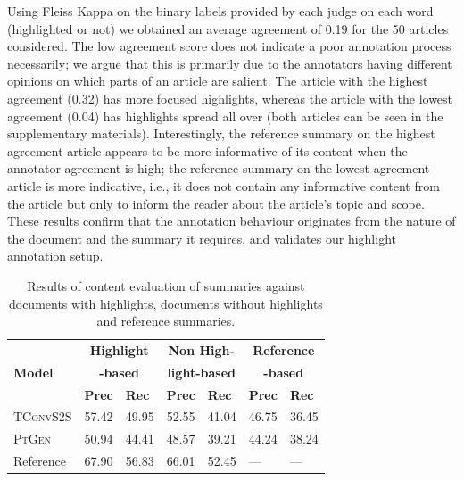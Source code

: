 \documentclass[11pt,a4paper]{article}
\newcommand\ptgen{\textsc{PtGen}}
\newcommand\tconv{\textsc{TConvS2S}}
\begin{document}
Using Fleiss Kappa \citep{Josep1971} on the binary labels provided by each judge on each word (highlighted or not) we obtained an average agreement of 0.19 for the 50 articles considered. The low agreement score does not indicate a poor annotation process necessarily; we argue that this is primarily due to the annotators having different opinions on which parts of an article are salient. The article with the highest agreement (0.32) has more focused highlights, whereas the article with the lowest agreement (0.04) has highlights spread all over (both articles can be seen in the supplementary materials). Interestingly, the reference summary on the highest agreement article appears to be more informative of its content when the annotator agreement is high; the reference summary on the lowest agreement article is more indicative, i.e., it does not contain any informative content from the article but only to inform the reader about the article's topic and scope. These results confirm that the annotation behaviour originates from the nature of the document and the summary it requires, and validates our highlight annotation setup.

\begin{table}[t!]
\small
\begin{tabular}{l|p{0.4cm}p{0.6cm}|p{0.4cm}p{0.4cm}|p{0.4cm}p{0.4cm}}
\hline
\multirow{3}{*}{\textbf{Model}}                & \multicolumn{2}{c|}{\textbf{Highlight}}                              & \multicolumn{2}{c|}{\textbf{Non High-}} & 
\multicolumn{2}{c}{\textbf{Reference}}\\
\multirow{2}{*}{}                
& \multicolumn{2}{c|}{\textbf{-based}}                              & \multicolumn{2}{c|}{\textbf{light-based}} & 
\multicolumn{2}{c}{\textbf{-based}}\\
& \textbf{Prec} & \textbf{Rec} 
& \textbf{Prec} & \textbf{Rec}
& \textbf{Prec} & \textbf{Rec} \\ \hline
\tconv{} & 57.42 & 49.95 & 52.55 & 41.04 & 46.75 & 36.45             \\
\ptgen{} & 50.94 & 44.41 & 48.57 & 39.21  & 44.24 & 38.24             \\
Reference & 67.90 & 56.83 & 66.01 & 52.45  & --- & --- \\
\hline
\end{tabular}
\caption{Results of content evaluation of summaries against documents with highlights, documents without highlights and reference summaries.}
\label{table:summresult}
\end{table}
\end{document}
